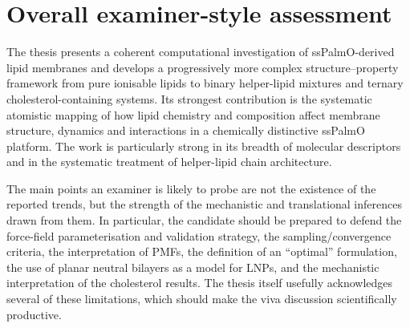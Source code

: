 \documentclass[11pt,a4paper]{article}
\begin{document}
\section*{Overall examiner-style assessment}

The thesis presents a coherent computational investigation of ssPalmO-derived lipid membranes and develops a progressively more complex structure--property framework from pure ionisable lipids to binary helper-lipid mixtures and ternary cholesterol-containing systems. Its strongest contribution is the systematic atomistic mapping of how lipid chemistry and composition affect membrane structure, dynamics and interactions in a chemically distinctive ssPalmO platform. The work is particularly strong in its breadth of molecular descriptors and in the systematic treatment of helper-lipid chain architecture.

The main points an examiner is likely to probe are not the existence of the reported trends, but the strength of the mechanistic and translational inferences drawn from them. In particular, the candidate should be prepared to defend the force-field parameterisation and validation strategy, the sampling/convergence criteria, the interpretation of PMFs, the definition of an ``optimal'' formulation, the use of planar neutral bilayers as a model for LNPs, and the mechanistic interpretation of the cholesterol results. The thesis itself usefully acknowledges several of these limitations, which should make the viva discussion scientifically productive.
\end{document}
